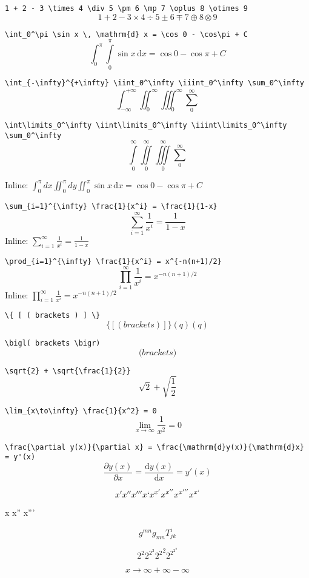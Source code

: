 \documentclass{article}
\begin{document}
\verb|1 + 2 - 3 \times 4 \div 5 \pm 6 \mp 7 \oplus 8 \otimes 9|
\[ 1 + 2 - 3 \times 4 \div 5 \pm 6 \mp 7 \oplus 8 \otimes 9 \]

\verb|\int_0^\pi \sin x \, \mathrm{d} x = \cos 0 - \cos\pi + C|
\[ \int_0^\pi \int\limits_0^\pi \sin x \, \mathrm{d} x = \cos 0 - \cos\pi + C \]

\verb|\int_{-\infty}^{+\infty} \iint_0^\infty \iiint_0^\infty \sum_0^\infty|
\[ \int_{-\infty}^{+\infty} \iint_0^\infty \iiint_0^\infty \sum_0^\infty \]

\verb|\int\limits_0^\infty \iint\limits_0^\infty \iiint\limits_0^\infty \sum_0^\infty|
\[ \int\limits_0^\infty \iint\limits_0^\infty \iiint\limits_0^\infty \sum_0^\infty \]

Inline: $\int_0^\pi dx \iint_0^\pi dy \iint_0^\pi \sin x \, \mathrm{d} x = \cos 0 - \cos\pi + C$

\verb|\sum_{i=1}^{\infty} \frac{1}{x^i} = \frac{1}{1-x}|
\[ \sum_{i=1}^{\infty} \frac{1}{x^i} = \frac{1}{1-x} \]
Inline: $\sum_{i=1}^{\infty} \frac{1}{x^i} = \frac{1}{1-x}$

\verb|\prod_{i=1}^{\infty} \frac{1}{x^i} = x^{-n(n+1)/2}|
\[ \prod_{i=1}^{\infty} \frac{1}{x^i} = x^{-n(n+1)/2} \]
Inline: $\prod_{i=1}^{\infty} \frac{1}{x^i} = x^{-n(n+1)/2}$

\verb|\{ [ ( brackets ) ] \}|
\[ \{ [ ( brackets ) ] \} (q) \left( q \right) \]

\verb|\bigl( brackets \bigr)|
\[ \bigl( brackets \bigr) \]

\verb|\sqrt{2} + \sqrt{\frac{1}{2}}|
\[ \sqrt{2} + \sqrt{\frac{1}{2}} \]

\verb|\lim_{x\to\infty} \frac{1}{x^2} = 0|
\[ \lim_{x\to\infty} \frac{1}{x^2} = 0 \]

\verb|\frac{\partial y(x)}{\partial x} = \frac{\mathrm{d}y(x)}{\mathrm{d}x} = y'(x)|
\[ \frac{\partial y(x)}{\partial x} = \frac{\mathrm{d}y(x)}{\mathrm{d}x} = y'(x) \]

\[ x' x'' x''' x` x^{x'} x^{x''} x^{x'''} x^{x`}\]

{\firatext x x'' x'''}


\[ g^{mn} g_{mn} T^{i}_{jk} \]

\[ 2^2 2^{2^2} {2^2}^2 2^{2^{2^2}} \]

\[ x \to \infty + \infty - \infty \]
\end{document}
